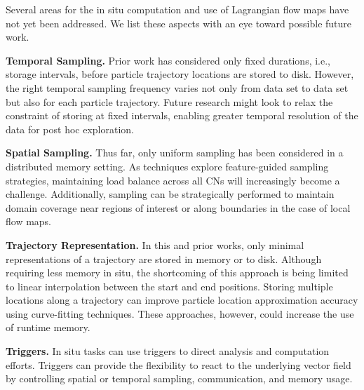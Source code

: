 %
Several areas for the in situ computation and use of Lagrangian flow maps have not yet been addressed.
%
We list these aspects with an eye toward possible future work.


\textbf{Temporal Sampling.} Prior work has considered only fixed durations, i.e., storage intervals, before particle trajectory locations are stored to disk. 
%
However, the right temporal sampling frequency varies not only from data set to data set but also for each particle trajectory.
%
Future research might look to relax the constraint of storing at fixed intervals, enabling greater temporal resolution of the data for post hoc exploration.
%

\textbf{Spatial Sampling.} Thus far, only uniform sampling has been considered in a distributed memory setting.
%
As techniques explore feature-guided sampling strategies, maintaining load balance across all CNs will increasingly become a challenge.
%
Additionally, sampling can be strategically performed to maintain domain coverage near regions of interest or along boundaries in the case of local flow maps.

\textbf{Trajectory Representation.} In this and prior works, only minimal representations of a trajectory are stored in memory or to disk.
%
Although requiring less memory in situ, the shortcoming of this approach is being limited to linear interpolation between the start and end positions. 
%
Storing multiple locations along a trajectory can improve particle location approximation accuracy using curve-fitting techniques.
%
These approaches, however, could increase the use of runtime memory. 

\textbf{Triggers.} In situ tasks can use triggers to direct analysis and computation efforts. 
%
Triggers can provide the flexibility to react to the underlying vector field by controlling spatial or temporal sampling, communication, and memory usage. 


